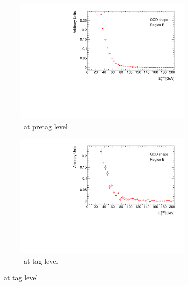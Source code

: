 \begin{figure}[htbp]
  \centering
    \begin{subfigure}[b]{0.45\textwidth}
      \includegraphics[width=0.95\textwidth]{PartCrossSection/Plots/Electron/h_el_pretag_MET_wgt.pdf}
      \caption{\met\ at pretag level} \label{fig:CrossRegionBpreMET}
    \end{subfigure}
    \;
    \begin{subfigure}[b]{0.45\textwidth}
      \includegraphics[width=0.95\textwidth]{PartCrossSection/Plots/Electron/h_el_tag_MET_wgt.pdf}
      \caption{\met\ at tag level} \label{fig:CrossRegionBTagMET}
    \end{subfigure}


\end{figure}
